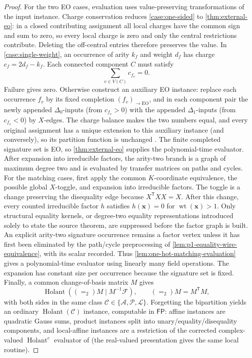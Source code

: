 \documentclass[11pt,letterpaper,onecolumn]{article}
\theoremstyle{plain}
\theoremstyle{definition}
\theoremstyle{remark}
\newcommand{\cF}{\mathcal F}
\newcommand{\cA}{\mathscr A}
\newcommand{\cP}{\mathscr P}
\newcommand{\cL}{\mathscr L}
\newcommand{\cC}{\mathscr C}
\newcommand{\Holant}{\operatorname{Holant}}
\newcommand{\FP}{\mathsf{FP}}
\newcommand{\wt}{\operatorname{wt}}
\newcommand{\EO}{\mathrm{EO}}
\newcommand{\Eq}{=}
\newcommand{\DeltaZero}{\Delta_0}
\newcommand{\DeltaOne}{\Delta_1}
\begin{document}
\begin{proof}
For the two EO cases, evaluation uses value-preserving transformations
of the input instance. Charge conservation reduces \cref{case:one-sided} to
\cref{thm:external-eo}: in a closed contributing assignment all local
charges have the common sign and sum to zero, so every local charge is zero
and only the central restrictions contribute. Deleting the off-central
entries therefore preserves the value. In \cref{case:single-weight}, an
occurrence of arity \(k_f\) and weight \(d_f\) has charge
\(c_f=2d_f-k_f\). Each connected component \(C\) must satisfy
\begin{equation*}
  \sum_{v\in V(C)}c_{f_v}=0.
\end{equation*}
Failure gives zero. Otherwise construct an auxiliary EO instance:
replace each occurrence \(f_v\) by its fixed completion
\((f_v)_{\to\EO}\), and in each component pair the newly appended
\(\DeltaZero\)-inputs (from \(c_{f_v}>0\)) with the appended
\(\DeltaOne\)-inputs (from \(c_{f_v}<0\)) by \(X\)-edges.  The charge
balance makes the two numbers equal, and every original assignment has a
unique extension to this auxiliary instance (and conversely), so its
partition function is unchanged
\cite[Section~6.2, proof of Corollary~68]{MengWangXia2025EO}.
The finite completed signature set is EO, so \cref{thm:external-eo}
supplies the polynomial-time evaluator.
After expansion into irreducible factors, the arity-two branch is a graph of maximum
degree two and is evaluated by transfer matrices on paths and cycles.
For the matching cases, first apply the common \(K\)-coordinate
equivalence, the possible global \(X\)-toggle, and expansion into irreducible factors.
The toggle is a change preserving the disequality edge because \(X^{\mathsf T}XX=X\).
After this change, every counted irreducible factor \(h\) satisfies
\(h({\mathbf{x}})=0\) for \(\wt({\mathbf{x}})>1\).  Only structural equality kernels, or degree-two equality
representations introduced solely to state the source theorem, are
suppressed before the factor graph is built. An explicit arity-two signature
occurrence remains a factor vertex unless it has first been eliminated by the
path/cycle preprocessing of \cref{lem:p1-equality-wire-equivalence}, with its
scalar recorded.  Thus
\cref{lem:one-hot-matching-evaluation} gives a polynomial-time evaluator
using linearly many field operations. The
expansion has constant size per occurrence because the signature set is
fixed.  Finally, a common change-of-basis matrix \(M\) gives
\[
  \Holant((\Eq_2)M\mid M^{-1}\cF),
  \qquad(\Eq_2)M=M^{\mathsf T}M,
\]
with both sides in the same class
\(\cC\in\{\cA,\cP,\cL\}\).  Forgetting the
bipartition yields an ordinary \(\Holant(\cC)\) instance, computable in
\(\FP\): affine instances are quadratic Gauss sums, product instances split
into unary/equality/disequality components, and local-affine instances are a
restriction of the corrected complex-valued \(\Holant^c\) evaluator of
\cite{Backens2021,Backens2025} (the real-valued presentation
\cite[Corollary~3.1]{CaiLuXia2018RealHolantc} gives the same local routine).
\end{proof}
\end{document}
